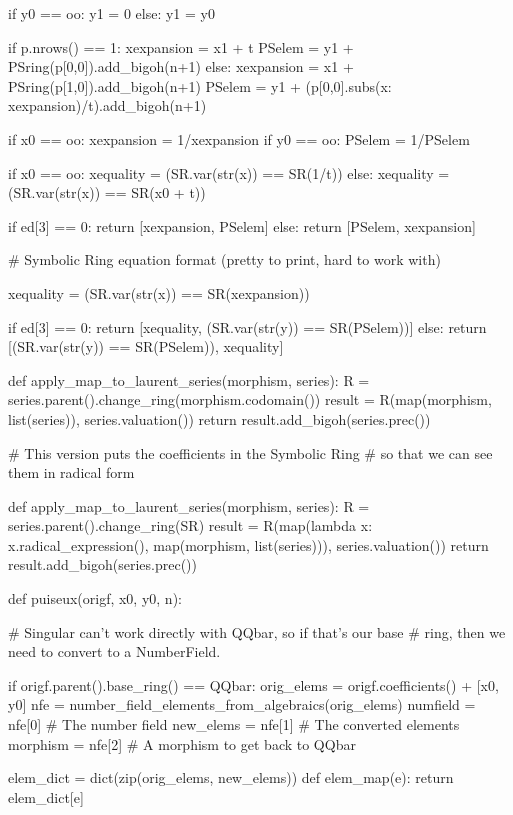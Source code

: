 \begin{sageblock}
    if y0 == oo:
        y1 = 0
    else:
        y1 = y0

    if p.nrows() == 1:
        xexpansion = x1 + t
        PSelem = y1 + PSring(p[0,0]).add_bigoh(n+1)
    else:
        xexpansion = x1 + PSring(p[1,0]).add_bigoh(n+1)
        PSelem = y1 + (p[0,0].subs({x: xexpansion})/t).add_bigoh(n+1)

    if x0 == oo:
        xexpansion = 1/xexpansion
    if y0 == oo:
        PSelem = 1/PSelem

    if x0 == oo:
       xequality = (SR.var(str(x)) == SR(1/t))
    else:
       xequality = (SR.var(str(x)) == SR(x0 + t))

    if ed[3] == 0:
        return [xexpansion, PSelem]
    else:
        return [PSelem, xexpansion]

    # Symbolic Ring equation format (pretty to print, hard to work with)

    xequality = (SR.var(str(x)) == SR(xexpansion))

    if ed[3] == 0:
        return [xequality, (SR.var(str(y)) == SR(PSelem))]
    else:
        return [(SR.var(str(y)) == SR(PSelem)), xequality]

def apply_map_to_laurent_series(morphism, series):
    R = series.parent().change_ring(morphism.codomain())
    result = R(map(morphism, list(series)), series.valuation())
    return result.add_bigoh(series.prec())

# This version puts the coefficients in the Symbolic Ring
# so that we can see them in radical form

def apply_map_to_laurent_series(morphism, series):
    R = series.parent().change_ring(SR)
    result = R(map(lambda x: x.radical_expression(), map(morphism, list(series))), series.valuation())
    return result.add_bigoh(series.prec())

def puiseux(origf, x0, y0, n):

    # Singular can't work directly with QQbar, so if that's our base
    # ring, then we need to convert to a NumberField.

    if origf.parent().base_ring() == QQbar:
        orig_elems = origf.coefficients() + [x0, y0]
        nfe = number_field_elements_from_algebraics(orig_elems)
        numfield = nfe[0]  # The number field
        new_elems = nfe[1] # The converted elements
        morphism = nfe[2]  # A morphism to get back to QQbar

        elem_dict = dict(zip(orig_elems, new_elems))
        def elem_map(e): return elem_dict[e]


\end{sageblock}
